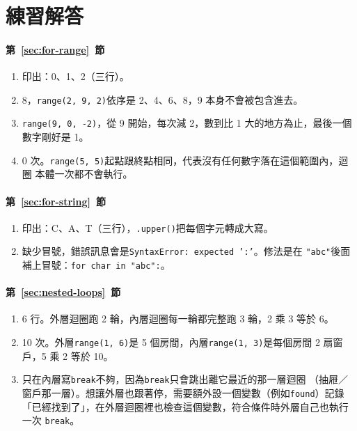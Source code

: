 \section*{練習解答}

\paragraph{第~\ref{sec:for-range}~節}
\begin{enumerate}
\item 印出：0、1、2（三行）。
\item 8，\texttt{range(2, 9, 2)}依序是 2、4、6、8，9 本身不會被包含進去。
\item \texttt{range(9, 0, -2)}，從 9 開始，每次減 2，數到比 1 大的地方為止，最後一個
數字剛好是 1。
\item 0 次。\texttt{range(5, 5)}起點跟終點相同，代表沒有任何數字落在這個範圍內，迴圈
本體一次都不會執行。
\end{enumerate}

\paragraph{第~\ref{sec:for-string}~節}
\begin{enumerate}
\item 印出：C、A、T（三行），\texttt{.upper()}把每個字元轉成大寫。
\item 缺少冒號，錯誤訊息會是\texttt{SyntaxError: expected ':'}。修法是在
\texttt{"abc"}後面補上冒號：\texttt{for char in "abc":}。
\end{enumerate}

\paragraph{第~\ref{sec:nested-loops}~節}
\begin{enumerate}
\item 6 行。外層迴圈跑 2 輪，內層迴圈每一輪都完整跑 3 輪，2 乘 3 等於 6。
\item 10 次。外層\texttt{range(1, 6)}是 5 個房間，內層\texttt{range(1, 3)}是每個房間
2 扇窗戶，5 乘 2 等於 10。
\item 只在內層寫\texttt{break}不夠，因為\texttt{break}只會跳出離它最近的那一層迴圈
（抽屜／窗戶那一層）。想讓外層也跟著停，需要額外設一個變數（例如\texttt{found}）記錄
「已經找到了」，在外層迴圈裡也檢查這個變數，符合條件時外層自己也執行一次
\texttt{break}。
\end{enumerate}


